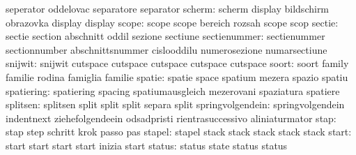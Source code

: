                            seperator                 oddelovac
                           separatore                separator
                   scherm: scherm                    display
                           bildschirm                obrazovka
                           display                   display %
                    scope: scope                     scope
                           bereich                   rozsah
                           scope                     scop %
                   sectie: sectie                    section
                           abschnitt                 oddil
                           sezione                   sectiune
             sectienummer: sectienummer              sectionnumber
                           abschnittsnummer          cislooddilu
                           numerosezione             numarsectiune
                  snijwit: snijwit                   cutspace
                           cutspace                  cutspace
                           cutspace                  cutspace %
                    soort: soort                     family
                           familie                   rodina
                           famiglia                  familie
                   spatie: spatie                    space
                           spatium                   mezera
                           spazio                    spatiu
               spatiering: spatiering                spacing
                           spatiumausgleich          mezerovani
                           spaziatura                spatiere
                 splitsen: splitsen                  split
                           split                     split
                           separa                    split %
         springvolgendein: springvolgendein          indentnext
                           ziehefolgendeein          odsadpristi
                           rientrasuccessivo         aliniaturmator
                     stap: stap                      step
                           schritt                   krok
                           passo                     pas
                   stapel: stapel                    stack
                           stack                     stack
                           stack                     stack %
                    start: start                     start
                           start                     start
                           inizia                    start
                   status: status                    state
                           status                    status

